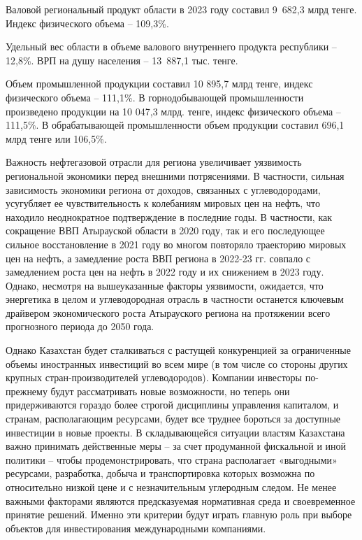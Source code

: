\begin{multicols}{2}
Валовой региональный продукт области в 2023 году составил 9~682,3 млрд
тенге. Индекс физического объема -- 109,3\%.

Удельный вес области в объеме валового внутреннего продукта республики
-- 12,8\%. ВРП на душу населения -- 13~887,1 тыс. тенге.

Объем промышленной продукции составил 10 895,7 млрд тенге, индекс
физического объема -- 111,1\%. В горнодобывающей промышленности
произведено продукции на 10 047,3 млрд. тенге, индекс физического объема
-- 111,5\%. В обрабатывающей промышленности объем продукции составил
696,1 млрд тенге или 106,5\%.

Важность нефтегазовой отрасли для региона увеличивает уязвимость
региональной экономики перед внешними потрясениями. В частности, сильная
зависимость экономики региона от доходов, связанных с углеводородами,
усугубляет ее чувствительность к колебаниям мировых цен на нефть, что
находило неоднократное подтверждение в последние годы. В частности, как
сокращение ВВП Атырауской области в 2020 году, так и его последующее
сильное восстановление в 2021 году во многом повторяло траекторию
мировых цен на нефть, а замедление роста ВВП региона в 2022-23 гг.
совпало с замедлением роста цен на нефть в 2022 году и их снижением в
2023 году. Однако, несмотря на вышеуказанные факторы уязвимости,
ожидается, что энергетика в целом и углеводородная отрасль в частности
останется ключевым драйвером экономического роста Атырауского региона на
протяжении всего прогнозного периода до 2050 года.

Однако Казахстан будет сталкиваться с растущей конкуренцией за
ограниченные объемы иностранных инвестиций во всем мире (в том числе со
стороны других крупных стран-производителей углеводородов). Компании
инвесторы по-прежнему будут рассматривать новые возможности, но теперь
они придерживаются гораздо более строгой дисциплины управления
капиталом, и странам, располагающим ресурсами, будет все труднее
бороться за доступные инвестиции в новые проекты. В складывающейся
ситуации властям Казахстана важно принимать действенные меры -- за счет
продуманной фискальной и иной политики -- чтобы продемонстрировать, что
страна располагает «выгодными» ресурсами, разработка, добыча и
транспортировка которых возможна по относительно низкой цене и с
незначительным углеродным следом. Не менее важными факторами являются
предсказуемая нормативная среда и своевременное принятие решений. Именно
эти критерии будут играть главную роль при выборе объектов для
инвестирования международными компаниями.
\end{multicols}

